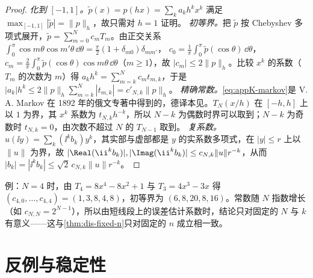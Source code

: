 \begin{proof}
\emph{化到 $[-1,1]$。}$\tilde p(x)=p(hx)=\sum_ka_kh^kx^k$ 满足 $\max_{[-1,1]}|\tilde p|=\|p\|_h$，故只需对 $h=1$ 证明。
\emph{初等界。}把 $\tilde p$ 按 Chebyshev 多项式展开，$\tilde p=\sum_{m=0}^Nc_mT_m$。由正交关系 $\int_0^\pi\cos m\theta\cos m'\theta\,\dd\theta=\frac\pi2(1+\delta_{m0})\delta_{mm'}$，
$c_0=\frac1\pi\int_0^\pi\tilde p(\cos\theta)\,\dd\theta$，$c_m=\frac2\pi\int_0^\pi\tilde p(\cos\theta)\cos m\theta\,\dd\theta$（$m\ge1$），故 $|c_m|\le2\|p\|_h$。比较 $x^k$ 的系数（$T_m$ 的次数为 $m$）得 $a_kh^k=\sum_{m=k}^Nc_mt_{m,k}$，于是 $|a_k|h^k\le2\|p\|_h\sum_{m=k}^N|t_{m,k}|=c'_{N,k}\|p\|_h$。
\emph{精确常数。}\cref{eq:appK-markov}是 V. A. Markov 在 1892 年的俄文专著中得到的，德译本见\cite{Markoff1916}。$T_N(x/h)$ 在 $[-h,h]$ 上以 $1$ 为界，其 $x^k$ 系数为 $t_{N,k}h^{-k}$，所以 $N-k$ 为偶数时界可以取到；$N-k$ 为奇数时 $t_{N,k}=0$，由次数不超过 $N$ 的 $T_{N-1}$ 取到。
\emph{复系数。}$u(\ii y)=\sum_k(\ii^kb_k)y^k$，其实部与虚部都是 $y$ 的实系数多项式，在 $|y|\le r$ 上以 $\|u\|$ 为界，故 $|\Real(\ii^kb_k)|,|\Imag(\ii^kb_k)|\le c_{N,k}\|u\|r^{-k}$，从而 $|b_k|=|\ii^kb_k|\le\sqrt2\,c_{N,k}\|u\|r^{-k}$。
\end{proof}

例：$N=4$ 时，由 $T_4=8x^4-8x^2+1$ 与 $T_3=4x^3-3x$ 得 $(c_{4,0},\dots,c_{4,4})=(1,3,8,4,8)$，初等界为 $(6,8,20,8,16)$。常数随 $N$ 指数增长（如 $c_{N,N}=2^{N-1}$），所以由短线段上的误差估计系数时，结论只对固定的 $N$ 与 $k$ 有意义——这与\cref{thm:dis-fixed-n}只对固定的 $n$ 成立相一致。

\section{反例与稳定性}\label{sec:appK-counterexamples}

